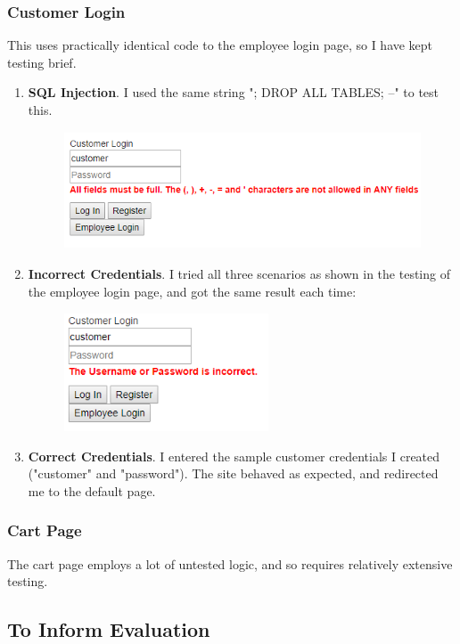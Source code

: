 ﻿\documentclass{article}
\begin{document}
    \subsubsection{Customer Login}
    This uses practically identical code to the employee login page, so I have kept testing brief.
    \begin{enumerate}
        \item \textbf{SQL Injection}.
        I used the same string "; DROP ALL TABLES; --" to test this.
        \begin{figure}[H]
            \includegraphics[height=3.5cm]{testing/cusLogin1.png}
            \centering
        \end{figure}
        \item \textbf{Incorrect Credentials}.
        I tried all three scenarios as shown in the testing of the employee login page, and got the same result each time:
        \begin{figure}[H]
            \includegraphics[height=3.5cm]{testing/cusLogin2.png}
            \centering
        \end{figure}
        \item \textbf{Correct Credentials}.
        I entered the sample customer credentials I created ("customer" and "password").
        The site behaved as expected, and redirected me to the default page.
    \end{enumerate}
    \subsubsection{Cart Page}
    The cart page employs a lot of untested logic, and so requires relatively extensive testing.
    \subsection{To Inform Evaluation}
    
\end{document}
